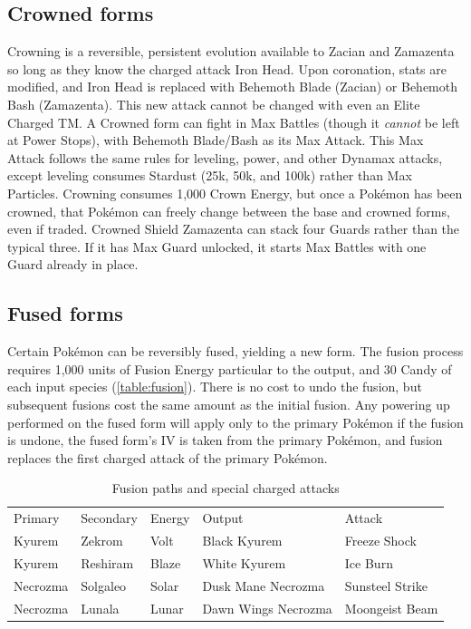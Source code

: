 \subsection{Crowned forms\label{sec:crowned}}
Crowning is a reversible, persistent evolution available to Zacian and Zamazenta
 so long as they know the charged attack Iron Head.
Upon coronation, stats are modified, and Iron Head is replaced with Behemoth Blade (Zacian)
  or Behemoth Bash (Zamazenta).
This new attack cannot be changed with even an Elite Charged TM\@.
A Crowned form can fight in Max Battles (though it \textit{cannot} be left at Power Stops), with Behemoth Blade/Bash as its Max Attack.
This Max Attack follows the same rules for leveling, power, and other Dynamax attacks,
 except leveling consumes Stardust (25k, 50k, and 100k) rather than Max Particles.
Crowning consumes 1,000 Crown Energy, but once a Pokémon has been crowned,
  that Pokémon can freely change between the base and crowned
  forms, even if traded.
Crowned Shield Zamazenta can stack four Guards rather than the typical three.
If it has Max Guard unlocked, it starts Max Battles with one Guard already in place.

\subsection{Fused forms\label{sec:fusion}}
Certain Pokémon can be reversibly fused, yielding a new form.
The fusion process requires 1,000 units of Fusion Energy particular to the output,
 and 30 Candy of each input species (\autoref{table:fusion}).
There is no cost to undo the fusion, but subsequent fusions cost the same amount as the initial fusion.
Any powering up performed on the fused form will apply only to the primary
  Pokémon if the fusion is undone, the fused form's IV is taken from the primary Pokémon,
  and fusion replaces the first charged attack of the primary Pokémon.

\begin{table}[ht]
\centering
\footnotesize
\begin{tabular}{lllll}
Primary & Secondary & Energy & Output & Attack\\
\Midrule
Kyurem & Zekrom & Volt & Black Kyurem & Freeze Shock\\
Kyurem & Reshiram & Blaze & White Kyurem & Ice Burn\\
Necrozma & Solgaleo & Solar & Dusk Mane Necrozma & Sunsteel Strike\\
Necrozma & Lunala & Lunar & Dawn Wings Necrozma & Moongeist Beam\\
\end{tabular}
\caption{Fusion paths and special charged attacks\label{table:fusion}}
\end{table}

